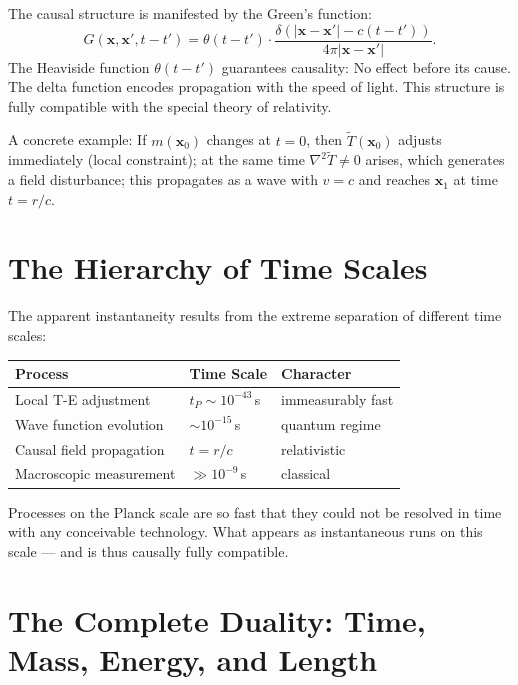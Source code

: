 The causal structure is manifested by the Green's function:
\begin{equation}
  G(\mathbf{x},\mathbf{x}',t-t') = \theta(t-t')\cdot
  \frac{\delta(|\mathbf{x}-\mathbf{x}'|-c(t-t'))}{4\pi|\mathbf{x}-\mathbf{x}'|}.
\end{equation}
The Heaviside function $\theta(t-t')$ guarantees causality: No
effect before its cause. The delta function encodes propagation with the
speed of light. This structure is fully compatible with the special
theory of relativity.

A concrete example: If $m(\mathbf{x}_0)$ changes at $t = 0$, then
$\tilde T(\mathbf{x}_0)$ adjusts immediately (local constraint);
at the same time $\nabla^2\tilde T\ne0$ arises, which generates a field disturbance;
this propagates as a wave with $v = c$ and reaches
$\mathbf{x}_1$ at time $t = r/c$.

\section{The Hierarchy of Time Scales}

The apparent instantaneity results from the extreme separation of
different time scales:

\begin{center}
\small\renewcommand{\arraystretch}{1.3}
\begin{tabular}{p{3.5cm}p{2.5cm}p{3.2cm}}
\toprule
\textbf{Process} & \textbf{Time Scale} & \textbf{Character} \\
\midrule
Local T-E adjustment & $t_P\sim10^{-43}$\,s & immeasurably fast \\
Wave function evolution & $\sim10^{-15}$\,s & quantum regime \\
Causal field propagation & $t = r/c$ & relativistic \\
Macroscopic measurement & $\gg10^{-9}$\,s & classical \\
\bottomrule
\end{tabular}
\end{center}

Processes on the Planck scale are so fast that they could not be resolved in time with any conceivable technology. What appears as
instantaneous runs on this scale --- and is thus causally
fully compatible.

\section{The Complete Duality: Time, Mass, Energy, and Length}

